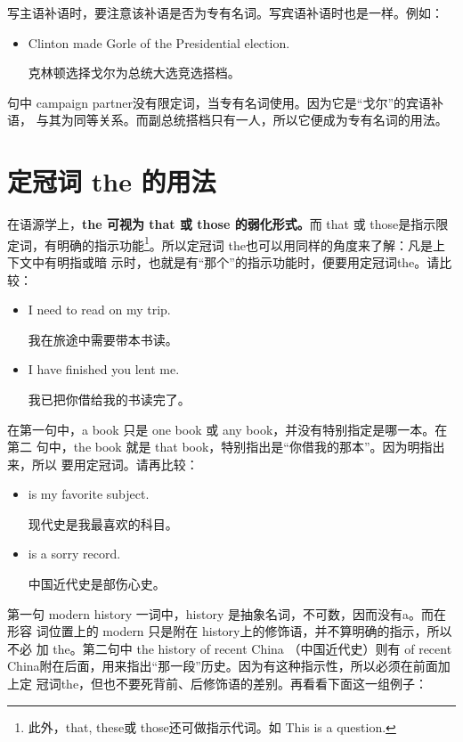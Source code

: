 写主语补语时，要注意该补语是否为专有名词。写宾语补语时也是一样。例如：

\begin{itemize}
\item  Clinton made Gorle  of the Presidential election.

  克林顿选择戈尔为总统大选竞选搭档。
\end{itemize}

句中 campaign partner没有限定词，当专有名词使用。因为它是“戈尔”的宾语补语，
与其为同等关系。而副总统搭档只有一人，所以它便成为专有名词的用法。

\section{定冠词 the 的用法}

在语源学上，\textbf{the 可视为 that 或 those 的弱化形式。}而 that 或 those是指示限
定词，有明确的指示功能\footnote{此外，that, these或 those还可做指示代词。如 This is a
  question. }。所以定冠词 the也可以用同样的角度来了解：凡是上下文中有明指或暗
示时，也就是有“那个”的指示功能时，便要用定冠词the。请比较：

\begin{itemize}
\item  I need  to read on my trip.

  我在旅途中需要带本书读。
\item  I have finished  you lent me.

  我已把你借给我的书读完了。
\end{itemize}

在第一句中，a book 只是 one book 或 any book，并没有特别指定是哪一本。在第二
句中，the book 就是 that book，特别指出是“你借我的那本”。因为明指出来，所以
要用定冠词。请再比较：

\begin{itemize}
\item  {} is my favorite subject.

  现代史是我最喜欢的科目。
\item  {} is a sorry record.

  中国近代史是部伤心史。
\end{itemize}

第一句 modern history 一词中，history 是抽象名词，不可数，因而没有a。而在形容
词位置上的 modern 只是附在 history上的修饰语，并不算明确的指示，所以不必
加 the。第二句中 the history of recent China （中国近代史）则有 of recent
China附在后面，用来指出“那一段”历史。因为有这种指示性，所以必须在前面加上定
冠词the，但也不要死背前、后修饰语的差别。再看看下面这一组例子：

